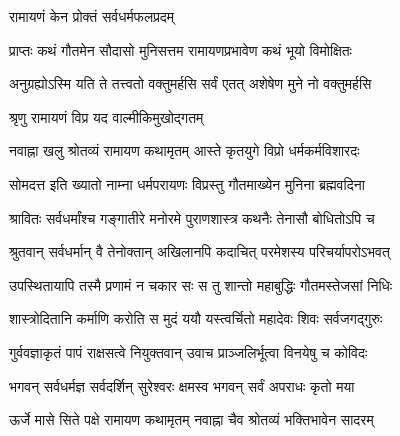  



\onelineshloka
{रामायणं केन प्रोक्तं सर्वधर्मफलप्रदम्}%

 

\twolineshloka
{प्राप्तः कथं गौतमेन सौदासो मुनिसत्तम}
{रामायणप्रभावेण कथं भूयो विमोक्षितः}%

 

\twolineshloka
{अनुग्रह्योऽस्मि यति ते तत्त्वतो वक्तुमर्हसि}
{सर्वं एतत् अशेषेण मुने नो वक्तुमर्हसि}%

 


\onelineshloka
{श्रृणु रामायणं विप्र यद वाल्मीकिमुखोद्‌गतम्}%

\twolineshloka
{नवाह्ना खलु श्रोतव्यं रामायण कथामृतम्}
{आस्ते कृतयुगे विप्रो धर्मकर्मविशारदः}%

 

\twolineshloka
{सोमदत्त इति ख्यातो नाम्ना धर्मपरायणः}
{विप्रस्तु गौतमाख्येन मुनिना ब्रह्मवदिना}%

 

\twolineshloka
{श्रावितः सर्वधर्मांश्च गङ्गातीरे मनोरमे}
{पुराणशास्त्र कथनैः तेनासौ बोधितोऽपि च}%

 

\twolineshloka
{श्रुतवान् सर्वधर्मान् वै तेनोक्तान् अखिलानपि}
{कदाचित् परमेशस्य परिचर्यापरोऽभवत्}%

 

\twolineshloka
{उपस्थितायापि तस्मै प्रणामं न चकार सः}
{स तु शान्तो महाबुद्धिः गौतमस्तेजसां निधिः}%

 

\twolineshloka
{शास्त्रोदितानि कर्माणि करोति स मुदं ययौ}
{यस्त्वर्चितो महादेवः शिवः सर्वजगद्‌गुरुः}%

 

\twolineshloka
{गुर्ववज्ञाकृतं पापं राक्षसत्वे नियुक्तवान्}
{उवाच प्राञ्जलिर्भूत्वा विनयेषु च कोविदः}%

 


\twolineshloka
{भगवन् सर्वधर्मज्ञ सर्वदर्शिन् सुरेश्वरः}
{क्षमस्व भगवन् सर्वं अपराधः कृतो मया}%

 


\twolineshloka
{ऊर्जे मासे सिते पक्षे रामायण कथामृतम्}
{नवाह्ना चैव श्रोतव्यं भक्तिभावेन सादरम्}%

